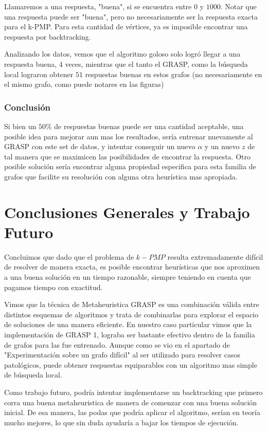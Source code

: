 Llamaremos a una respuesta, "buena", si se encuentra entre $0$ y $1000$. Notar que una respuesta puede ser "buena", pero no necesariamente ser la respuesta exacta para el k-PMP. Para esta cantidad de vértices, ya es imposible encontrar una respuesta por backtracking.

Analizando los datos, vemos que el algoritmo goloso solo logró llegar a una respuesta buena, 4 veces, mientras que el tanto el GRASP, como la búsqueda local lograron obtener $51$ respuestas buenas en estos grafos (no necesariamente en el mismo grafo, como puede notares en las figuras)

\subsubsection{Conclusión}

Si bien un $50 \%$ de respuestas buenas puede ser una cantidad aceptable, una posible idea para mejorar aun mas los resultados, sería entrenar nuevamente al GRASP con este set de datos, y intentar conseguir un nuevo $\alpha$ y un nuevo $z$ de tal manera que se maximicen las posibilidades de encontrar la respuesta. Otro posible solución sería encontrar alguna propiedad especifica para esta familia de grafos que facilite su resolución con alguna otra heurística mas apropiada.

\section{Conclusiones Generales y Trabajo Futuro}

Concluimos que dado que el problema de $k-PMP$ resulta extremadamente difícil de resolver de manera exacta, es posible encontrar heurísticas que nos aproximen a una buena solución en un tiempo razonable, siempre teniendo en cuenta que pagamos tiempo con exactitud.

Vimos que la técnica de Metaheuristica GRASP es una combinación válida entre distintos esquemas de algoritmos y trata de combinarlas para explorar el espacio de soluciones de una manera eficiente. En nuestro caso particular vimos que la implementación de GRASP 1, lograba ser bastante efectivo dentro de la familia de grafos para las fue entrenado. Aunque como se vio en el apartado de "Experimentación sobre un grafo difícil" al ser utilizado para resolver casos patológicos, puede obtener respuestas equiparables con un algoritmo mas simple de búsqueda local.

Como trabajo futuro, podría intentar implementarse un backtracking que primero corra una buena metaheuristica de manera de comenzar con una buena solución inicial. De esa manera, las podas que podría aplicar el algoritmo, serían en teoría mucho mejores, lo que sin duda ayudaría a bajar los tiempos de ejecución.
